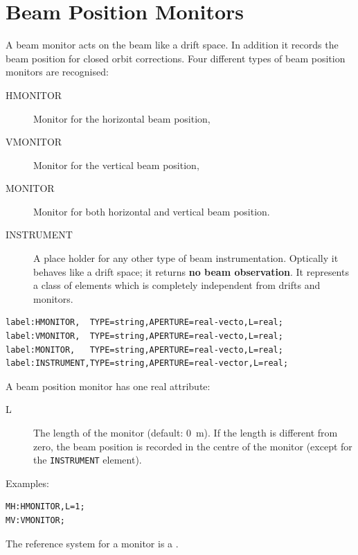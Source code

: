 \section{Beam Position Monitors}
\label{sec:monitors}
A beam monitor acts on the beam like a drift space.
In addition it records the beam position for closed orbit
corrections. 
Four different types of beam position monitors are recognised:
\begin{description}
\item[HMONITOR]
  \label{sec:hmonitor}
  Monitor for the horizontal beam position,
\item[VMONITOR]
  \label{sec:vmonitor}
  Monitor for the vertical beam position,
\item[MONITOR]
  \label{sec:monitor}
  Monitor for both horizontal and vertical beam position.
\item[INSTRUMENT]
  \label{sec:instrument}
  A place holder for any other type of beam instrumentation.
  Optically it behaves like a drift space;
  it returns \textbf{no beam observation}.
  It represents a class of elements
  which is completely independent from drifts and monitors.
\end{description}
\begin{verbatim}
label:HMONITOR,  TYPE=string,APERTURE=real-vecto,L=real;
label:VMONITOR,  TYPE=string,APERTURE=real-vecto,L=real;
label:MONITOR,   TYPE=string,APERTURE=real-vecto,L=real;
label:INSTRUMENT,TYPE=string,APERTURE=real-vector,L=real;
\end{verbatim}
A beam position monitor has one real attribute:
\begin{description}
\item[L]
  The length of the monitor (default: 0~m). 
  If the length is different from zero,
  the beam position is recorded in the centre of the monitor
  (except for the \texttt{INSTRUMENT} element).
\end{description}
\noindent Examples:
\begin{verbatim}
MH:HMONITOR,L=1;
MV:VMONITOR;
\end{verbatim}
The reference system for a monitor is a 
.
